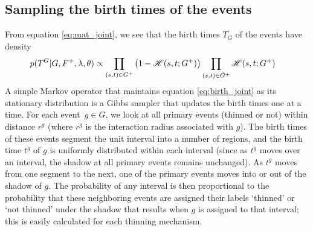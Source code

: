 \documentclass{statsoc}
\begin{document}
\subsection{Sampling the birth times of the \matern events}
From equation \eqref{eq:mat_joint}, we see that the birth times $T_G$ of the \matern events have density
\begin{align}
 p(T^G | G, F^+, \lambda, \theta) &\propto %
              \prod_{({s}, {t}) \in G^+} \left(1 - \mathscr{H}({s},{t};G^+) \right)
              \prod_{({s}, {t}) \in \tG^+} \mathscr{H}({s},{t};G^+)  \label{eq:birth_joint}
\end{align}
A simple Markov operator that maintains equation \eqref{eq:birth_joint} as its stationary distribution is a Gibbs sampler that
updates the birth times one at a time. For each \matern event~${g \in G}$, we look at all primary events (thinned or not) within
distance $r^g$ (where $r^g$ is the interaction radius associated with $g$). The birth times of these events segment the unit interval into a number of regions, 
and the birth time $t^g$ of $g$ is uniformly distributed within each interval (since as $t^g$ moves over an interval, the shadow at all 
primary events remains unchanged). 
As $t^g$ moves from one segment to the next, one of the primary events moves into or out of the shadow of $g$. The probability of any interval is then proportional to
the probability that these neighboring events are assigned their labels `thinned' or `not thinned' under the shadow that results when $g$ is assigned to that 
interval; this is easily calculated for each thinning mechanism.
\end{document}

